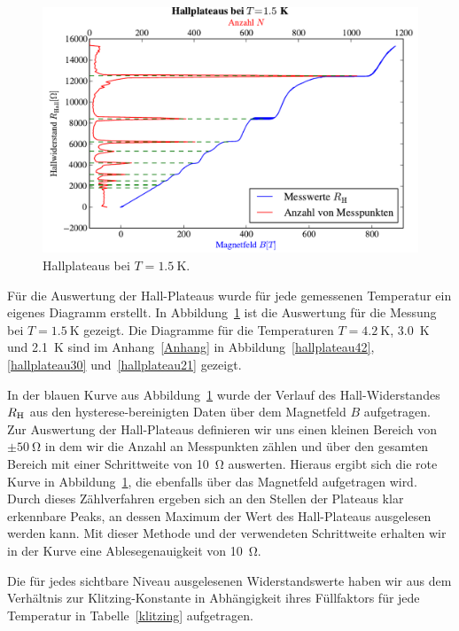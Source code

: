 \documentclass[paper=a4,fontsize=10pt,DIV=18,twocolumn,parskip=half]{scrartcl}
\numberwithin{equation}{section}    %
\begin{document}
\begin{figure}[htp]
	\begin{center}
		\includegraphics[width=\columnwidth]{Data-Plots/05-1,5-Hallplateaus.pdf}
		\caption{Hallplateaus bei $T=\SI{1.5}{\kelvin}$.}
		\label{hallplateau}
	\end{center}
\end{figure}

Für die Auswertung der Hall-Plateaus wurde für jede gemessenen Temperatur ein eigenes Diagramm erstellt. In Abbildung~\ref{hallplateau} ist die Auswertung für die Messung bei $T=\SI{1.5}{\kelvin}$ gezeigt. Die Diagramme für die Temperaturen $T = \SI{4.2}{\kelvin}$, \SI{3.0}{\kelvin} und \SI{2.1}{\kelvin} sind im Anhang~\ref{Anhang} in Abbildung~\ref{hallplateau42}, \ref{hallplateau30} und~\ref{hallplateau21} gezeigt.

In der blauen Kurve aus Abbildung~\ref{hallplateau} wurde der Verlauf des Hall-Widerstandes $R_{\rm H}$ aus den hysterese-bereinigten Daten über dem Magnetfeld $B$ aufgetragen.
Zur Auswertung der Hall-Plateaus definieren wir uns einen kleinen Bereich von $\pm \SI{50}{\ohm}$ in dem wir die Anzahl an Messpunkten zählen und über den gesamten Bereich mit einer Schrittweite von \SI{10}{\ohm} auswerten. Hieraus ergibt sich die rote Kurve in Abbildung~\ref{hallplateau}, die ebenfalls über das Magnetfeld aufgetragen wird. Durch dieses Zählverfahren ergeben sich an den Stellen der Plateaus klar erkennbare Peaks, an dessen Maximum der Wert des Hall-Plateaus ausgelesen werden kann. Mit dieser Methode und der verwendeten Schrittweite erhalten wir in der Kurve eine Ablesegenauigkeit von \SI{10}{\ohm}.

Die für jedes sichtbare Niveau ausgelesenen Widerstandswerte haben wir aus dem Verhältnis zur Klitzing-Konstante in Abhängigkeit ihres Füllfaktors für jede Temperatur in Tabelle~\ref{klitzing} aufgetragen.
\end{document}
